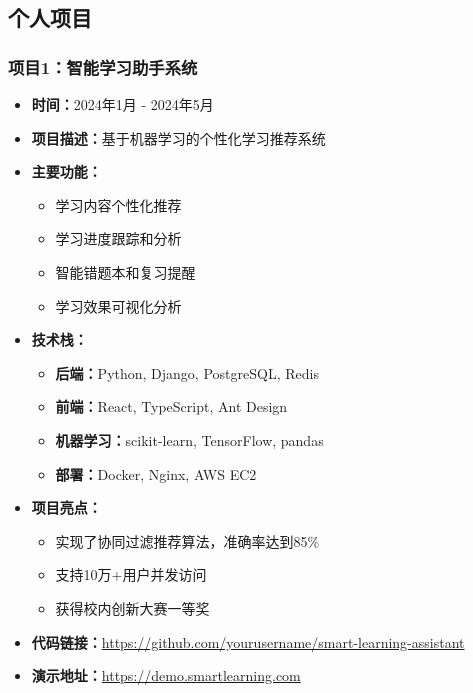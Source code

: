 \documentclass[a4paper,12pt]{article}
\begin{document}
\subsection{个人项目}

\subsubsection{项目1：智能学习助手系统}
\begin{itemize}
    \item \textbf{时间：}2024年1月 - 2024年5月
    \item \textbf{项目描述：}基于机器学习的个性化学习推荐系统
    \item \textbf{主要功能：}
    \begin{itemize}
        \item 学习内容个性化推荐
        \item 学习进度跟踪和分析
        \item 智能错题本和复习提醒
        \item 学习效果可视化分析
    \end{itemize}
    \item \textbf{技术栈：}
    \begin{itemize}
        \item \textbf{后端：}Python, Django, PostgreSQL, Redis
        \item \textbf{前端：}React, TypeScript, Ant Design
        \item \textbf{机器学习：}scikit-learn, TensorFlow, pandas
        \item \textbf{部署：}Docker, Nginx, AWS EC2
    \end{itemize}
    \item \textbf{项目亮点：}
    \begin{itemize}
        \item 实现了协同过滤推荐算法，准确率达到85\%
        \item 支持10万+用户并发访问
        \item 获得校内创新大赛一等奖
    \end{itemize}
    \item \textbf{代码链接：}\url{https://github.com/yourusername/smart-learning-assistant}
    \item \textbf{演示地址：}\url{https://demo.smartlearning.com}
\end{itemize}
\end{document}
